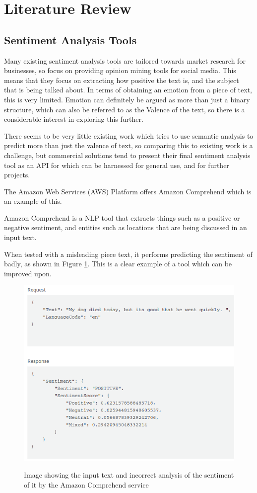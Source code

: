 
\section{Literature Review}
\subsection{Sentiment Analysis Tools}

Many existing sentiment analysis tools are tailored towards market research for businesses, so focus on providing opinion mining tools for social media. This means that they focus on extracting how positive the text is, and the subject that is being talked about. In terms of obtaining an emotion from a piece of text, this is very limited. Emotion can definitely be argued as more than just a binary structure, which can also be referred to as the Valence of the text, so there is a considerable interest in exploring this further.

There seems to be very little existing work which tries to use semantic analysis to predict more than just the valence of text, so comparing this to existing work is a challenge, but commercial solutions tend to present their final sentiment analysis tool as an API for which can be harnessed for general use, and for further projects.

The Amazon Web Services (AWS) Platform offers Amazon Comprehend \cite{aws} which is an example of this. 

Amazon Comprehend is a NLP tool that extracts things such as a positive or negative sentiment, and entities such as locations that are being discussed in an input text.

When tested with a misleading piece text, it performs predicting the sentiment of badly, as shown in Figure \ref{aws:sentiment}. This is a clear example of a tool which can be improved upon.

\begin{figure}[ht]
\caption{Image showing the input text and incorrect analysis of the sentiment of it by the Amazon Comprehend service}
\centering
\includegraphics[scale=0.5]{litImgs/comphrendResult.png}
\label{aws:sentiment}
\end{figure}

